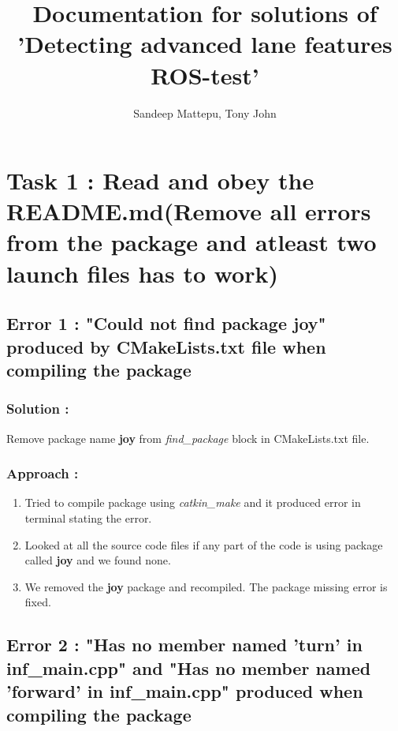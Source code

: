 \documentclass[12pt]{article}
\title{Documentation for solutions of 'Detecting advanced lane features ROS-test'}
\author{Sandeep Mattepu, Tony John}
\date{}
\begin{document}
	


\maketitle

\tableofcontents

\newpage


\section{Task 1 : Read and obey the README.md(Remove all errors from the package and atleast two launch files has to work)}


\subsection{Error 1 : "Could not find package joy" produced by CMakeLists.txt file when compiling the package}

\subsubsection{Solution : }
Remove package name \textbf{joy} from \textit{find\_package} block in CMakeLists.txt file.

\subsubsection{Approach :}
\begin{enumerate}
\item Tried to compile package using \textit{catkin\_make} and it produced error in terminal stating the error.
\item Looked at all the source code files if any part of the code is using package called \textbf{joy} and we found none.
\item We removed the \textbf{joy} package and recompiled. The package missing error is fixed.
\end{enumerate}


\subsection{Error 2 : "Has no member named 'turn' in inf\_main.cpp" and "Has no member named 'forward' in inf\_main.cpp" produced when compiling the package}
\end{document}
